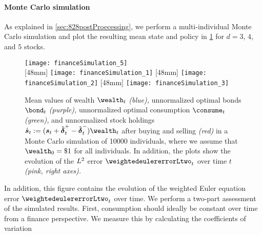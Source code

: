 \paragraph{Monte Carlo simulation}

As explained in \cref{sec:828postProecessing},
we perform a multi-individual Monte Carlo simulation
and plot the resulting mean state and policy in \cref{fig:financeSimulation}
for $d = 3$, $4$, and $5$ stocks.
\begin{figure}
  \texttt{[image: financeSimulation\_5]}%
  \\[2mm]%
  [48mm]{%
    \texttt{[image: financeSimulation\_1]}%
  }%
  \hfill%
  [48mm]{%
    \texttt{[image: financeSimulation\_2]}%
  }%
  \hfill%
  [48mm]{%
    \texttt{[image: financeSimulation\_3]}%
  }%
    \caption[Monte Carlo simulation of the transaction costs problem]{%
      Mean values of
      wealth $\wealth_t$
      \emph{\textcolor{C0}{(blue)},}
      unnormalized optimal bonds $\bond_t$
      \emph{\textcolor{C3}{(purple)},}
      unnormalized optimal consumption $\consume_t$
      \emph{\textcolor{C4}{(green)},} and
      unnormalized stock holdings
      $
        \acute{\vstock}_t
        := (\vstock_t + \vnormbuy_t - \vnormsell_t) \wealth_t
      $
      after buying and selling
      \emph{\textcolor{C1}{(red)}}
      in a Monte Carlo simulation of \num{10000} individuals,
      where we assume that $\wealth_0 = \$1$ for all individuals.
      In addition, the plots show the evolution of the
      $L^2$ error $\weightedeulererrorLtwo_t$ over time $t$
      \emph{\textcolor{C7}{(pink, right axes)}.}%
    }%
    \label{fig:financeSimulation}%
\end{figure}%
In addition, this figure contains the evolution of the
weighted Euler equation error $\weightedeulererrorLtwo_t$ over time.
We perform a two-part assessment of the simulated results.
First, consumption should ideally be constant over time
from a finance perspective.
We measure this by calculating the coefficients of variation
